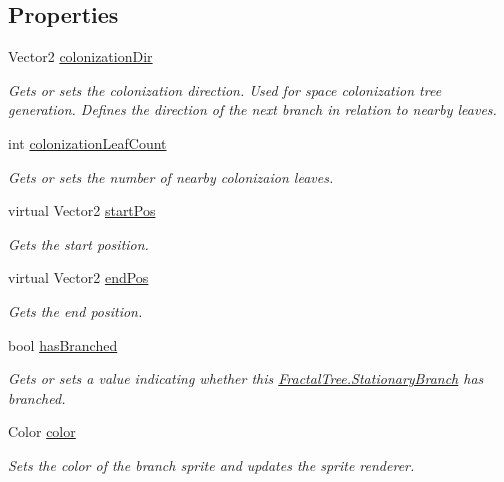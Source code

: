 \subsection*{Properties}
\begin{DoxyCompactItemize}
\item 
Vector2 \hyperlink{class_fractal_tree_1_1_stationary_branch_a723f9bad6ef25d1b3cb215484b7a3e76}{colonization\+Dir}
\begin{DoxyCompactList}\small\item\em Gets or sets the colonization direction. Used for space colonization tree generation. Defines the direction of the next branch in relation to nearby leaves. \end{DoxyCompactList}\item 
int \hyperlink{class_fractal_tree_1_1_stationary_branch_a8b1373ac7c9a1445f3670c6f8539b431}{colonization\+Leaf\+Count}
\begin{DoxyCompactList}\small\item\em Gets or sets the number of nearby colonizaion leaves. \end{DoxyCompactList}\item 
virtual Vector2 \hyperlink{class_fractal_tree_1_1_stationary_branch_a536f1353b6c082d193a12efa88ed3239}{start\+Pos}
\begin{DoxyCompactList}\small\item\em Gets the start position. \end{DoxyCompactList}\item 
virtual Vector2 \hyperlink{class_fractal_tree_1_1_stationary_branch_a0119dcc7bb419191c909cd1ae2f04f34}{end\+Pos}
\begin{DoxyCompactList}\small\item\em Gets the end position. \end{DoxyCompactList}\item 
bool \hyperlink{class_fractal_tree_1_1_stationary_branch_aabe8c4ecdd2bcfda07911f37f171e399}{has\+Branched}
\begin{DoxyCompactList}\small\item\em Gets or sets a value indicating whether this \hyperlink{class_fractal_tree_1_1_stationary_branch}{Fractal\+Tree.\+Stationary\+Branch} has branched. \end{DoxyCompactList}\item 
Color \hyperlink{class_fractal_tree_1_1_stationary_branch_a265ca67d50299986adb192386fc7b932}{color}
\begin{DoxyCompactList}\small\item\em Sets the color of the branch sprite and updates the sprite renderer. \end{DoxyCompactList}\end{DoxyCompactItemize}


